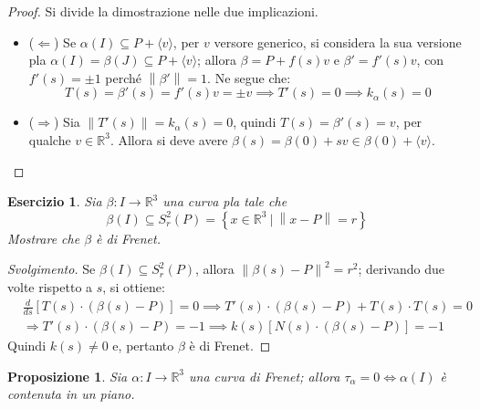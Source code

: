 \documentclass[12pt]{scrartcl}
\theoremstyle{style}
\newtheorem{prop}{Proposizione}[section]
\newtheorem{esercizio}{Esercizio}[section]
\newenvironment{svolgimento}{\renewcommand\qedsymbol{$\blacksquare$}\begin{proof}[Svolgimento]}{\end{proof}}
\numberwithin{equation}{subsection}
\begin{document}
	\begin{proof}
		Si divide la dimostrazione nelle due implicazioni.
		\begin{itemize}
			\item ($\Leftarrow$) Se $\alpha (I) \subseteq P+ \langle v \rangle$, per $v$ versore generico, si considera la sua versione pla $\alpha (I) = \beta (J) \subseteq P+\langle v \rangle$; allora $\beta = P + f(s) v$ e $\beta '=f'(s) v$, con $f'(s)=\pm 1$ perch\'e $\left\lVert \beta ' \right\rVert = 1$. 
				Ne segue che:
				\[
				T(s) = \beta '(s) = f'(s) v = \pm v \implies T'(s) = 0 \implies k_\alpha(s) = 0 
				\] 
			\item ($\Rightarrow $) Sia $\left\lVert T'(s) \right\rVert = k_\alpha (s) = 0 $, quindi $T(s) = \beta '(s) = v $, per qualche $v \in \mathbb{R}^3$.
				Allora si deve avere $\beta (s) =  \beta (0)+ s v \in \beta (0) +\langle v \rangle$.
		\end{itemize}
	\end{proof}
\begin{esercizio}
Sia $\beta :I \to \mathbb{R}^3$ una curva pla tale che
\[
\beta (I) \subseteq S_r^2(P) = \left\{ x \in \mathbb{R}^3 \ \big\lvert\ \left\lVert x- P \right\rVert = r\right\} 
\] 
Mostrare che $\beta  $ \`e di Frenet.
\end{esercizio}
\begin{svolgimento}
	Se $\beta (I) \subseteq S_r^2(P)$, allora $\left\lVert \beta (s) - P \right\rVert ^2 = r^2$; derivando due volte rispetto a $s$, si ottiene:
	\[
		\begin{split}
			&\frac{d }{d s}\left[  T(s) \cdot (\beta (s) - P )  \right] = 0 \implies T'(s) \cdot (\beta (s) - P) + T(s) \cdot T(s) = 0 \\
			&\Rightarrow T'(s) \cdot (\beta (s) - P) = -1 \implies k(s) \left[ N(s) \cdot (\beta (s) - P) \right] = - 1
		\end{split}
	\] 
	Quindi $k(s) \neq 0$ e, pertanto $\beta $ \`e di Frenet.
\end{svolgimento}
\begin{prop}
	Sia $\alpha  : I \to \mathbb{R}^3$ una curva di Frenet; allora $\tau _\alpha = 0 \iff \alpha (I)$ \`e contenuta in un piano.
\end{prop}
\end{document}
